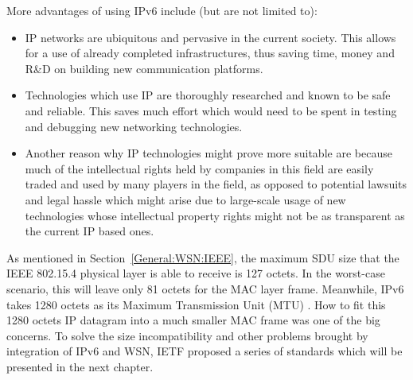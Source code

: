 More advantages of using IPv6 include (but are not limited to):  
\begin{itemize}
\item IP networks are ubiquitous and pervasive in the current society.  This allows for a use of already completed infrastructures, thus saving time, money and R\&D on building new communication platforms.
\newline
 
\item Technologies which use IP are thoroughly researched and known to be safe and reliable.  This saves much effort which would need to be spent in testing and debugging new networking technologies. 
\newline

\item Another reason why IP technologies might prove more suitable are because much of the intellectual rights held by companies in this field are easily traded and used by many players in the field, as opposed to potential lawsuits and legal hassle which might arise due to large-scale usage of new technologies whose intellectual property rights might not be as transparent as the current IP based ones.
\newline

\end{itemize}

As mentioned in Section~\ref{General:WSN:IEEE}, the maximum SDU size that the IEEE 802.15.4 physical layer is able to receive is 127 octets. In the worst-case scenario, this will leave only 81 octets for the MAC layer frame. Meanwhile, IPv6 takes 1280 octets as its Maximum Transmission Unit (MTU) \cite{RFC 4919}. How to fit this 1280 octets IP datagram into a much smaller MAC frame was one of the big concerns. To solve the  size incompatibility and other problems brought by integration of IPv6 and WSN, IETF proposed a series of standards which will be presented in the next chapter.



